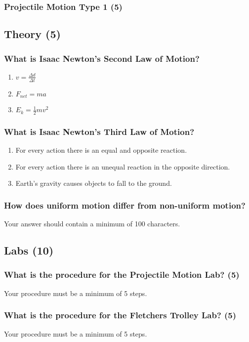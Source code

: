 \documentclass{article}
\begin{document}
\subsubsection{Projectile Motion Type 1 (5)}

\subsection{Theory (5)}
\subsubsection{What is Isaac Newton's Second Law of Motion?}
\begin{enumerate}[label=\alph*)]
    \item $v = \frac{\Delta d}{\Delta t}$
    \item $F_{net} = ma$
    \item $E_{k} = \frac{1}{2}mv^2$
\end{enumerate}
\subsubsection{What is Isaac Newton's Third Law of Motion?}
\begin{enumerate}[label=\alph*)]
    \item For every action there is an equal and opposite reaction.
    \item For every action there is an unequal reaction in the opposite direction.
    \item Earth's gravity causes objects to fall to the ground.
\end{enumerate}


\subsubsection{How does uniform motion differ from non-uniform motion?}
Your answer should contain a minimum of 100 characters.

\subsection{Labs (10)}
\subsubsection{What is the procedure for the Projectile Motion Lab? (5)}
Your procedure must be a minimum of 5 steps.
\subsubsection{What is the procedure for the Fletchers Trolley Lab? (5)}
Your procedure must be a minimum of 5 steps.\\
\end{document}
